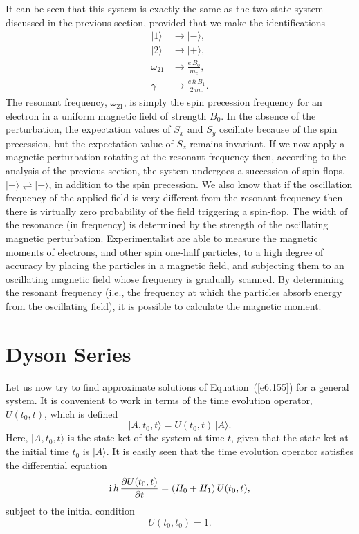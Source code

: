 It can be seen that this system is exactly the same as the two-state system
discussed in the previous section, provided that we make the identifications
\begin{align}
|1 \rangle &\rightarrow  |-\rangle,\\[0.5ex]
|2 \rangle &\rightarrow  |+\rangle,\\[0.5ex]
\omega_{21} &\rightarrow  \frac{e \,B_0}{m_e},\\[0.5ex]
\gamma &\rightarrow  \frac{e\,\hbar\, B_1}{2\,m_e}.
\end{align}
The resonant frequency, $\omega_{21}$, is simply the spin precession frequency
for an electron in a uniform magnetic field of strength $B_0$. In the
absence of the perturbation, the expectation values of $S_x$ and $S_y$ 
oscillate because of the spin precession, but the expectation value
of $S_z$ remains invariant. If we now apply a magnetic perturbation rotating
at the resonant frequency then, according to the analysis of the previous
section, the system undergoes a succession of spin-flops,
$|+\rangle \rightleftharpoons |-\rangle$, in addition to the spin
precession. We also know that if the oscillation frequency of the
applied field is very different from the resonant frequency then there is
virtually zero probability of the field triggering a spin-flop. The width
of the resonance (in frequency) is determined by the strength of the 
oscillating magnetic perturbation. Experimentalist are able to measure the
magnetic moments of electrons, and other spin one-half particles, to a
high degree of accuracy by placing the particles in a magnetic field, 
and subjecting them to an oscillating magnetic field whose frequency is
gradually  scanned. 
By determining the resonant frequency ({\rm i.e.}, the frequency at which the
particles absorb energy from the oscillating field), it is possible to
calculate the magnetic moment. 

\section{Dyson Series}
Let us now try to find approximate solutions of Equation~(\ref{e6.155}) for a general
system. It is convenient to work in terms of the time evolution
operator, $U(t_0, t)$, which is defined
\begin{equation}
|A, t_0, t\rangle = U(t_0, t) \,|A\rangle.
\end{equation}
Here, $|A, t_0, t\rangle$ is the state ket  of the
system at time $t$, given that the state ket at the initial
time $t_0$ is $|A\rangle$. It is easily seen that the time evolution operator
satisfies the differential equation
\begin{equation}
{\rm i}\, \hbar\, \frac{\partial U(t_0, t)}{\partial t} = (H_0 + H_1)\,
U(t_0, t),
\end{equation}
subject to  the initial condition
\begin{equation}
U(t_0, t_0 ) = 1.
\end{equation}

